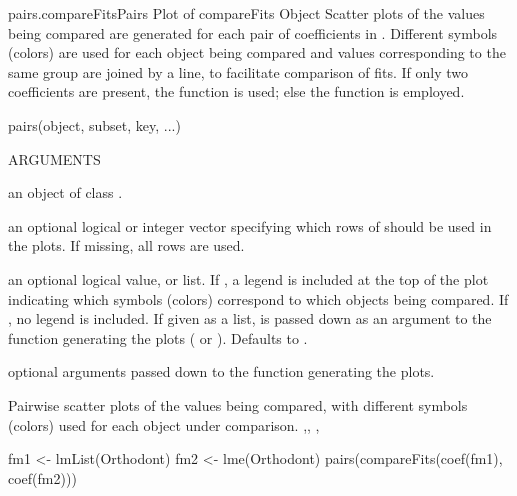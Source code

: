 \documentclass[pdftex]{article} \usepackage{url,graphicx}
\begin{document}
\begin{Helpfile}{pairs.compareFits}{Pairs Plot of compareFits Object}
Scatter plots of the values being compared are generated for each pair
of coefficients in . Different symbols (colors) are used
for each object being compared and values corresponding to the same
group are joined by a line, to facilitate comparison of fits. If only
two coefficients are present, the  function
 is used; else the  function 
is employed.
\begin{Example}
pairs(object, subset, key, ...)
\end{Example}
\begin{Argument}{ARGUMENTS}
\item[\Co{object:}]
an object of class .
\item[\Co{subset:}]
an optional logical or integer vector specifying which
rows of  should be used in the plots. If missing, all
rows are used.
\item[\Co{key:}]
an optional logical value, or list. If , a legend
is included at the top of the plot indicating which symbols (colors)
correspond to which objects being compared. If , no legend
is included. If given as a list,  is passed down as an
argument to the  function generating the plots
( or  ). Defaults to .
\item[\Co{...:}]
optional arguments passed down to the 
function generating the plots.
\end{Argument}
Pairwise scatter plots of the values being compared, with different
symbols (colors) used for each object under comparison.
,,
, 
\need 15pt
\vspace{-16pt} 
\begin{Example}
fm1 <- lmList(Orthodont)
fm2 <- lme(Orthodont)
pairs(compareFits(coef(fm1), coef(fm2)))
\end{Example}
\end{Helpfile}
\end{document}
